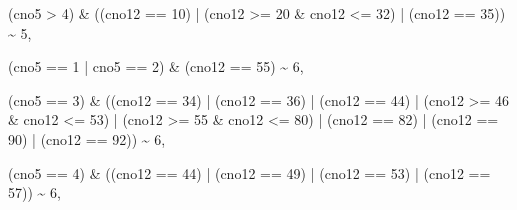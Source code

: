 \documentclass[
]{book}
\newenvironment{Shaded}{\begin{snugshade}}{\end{snugshade}}
\newcommand{\DecValTok}[1]{\textcolor[rgb]{0.00,0.00,0.81}{#1}}
\newcommand{\NormalTok}[1]{#1}
\newcommand{\SpecialCharTok}[1]{\textcolor[rgb]{0.00,0.00,0.00}{#1}}
\begin{document}
\begin{Shaded}
\begin{Highlighting}[]
\NormalTok{                        (cno5 }\SpecialCharTok{\textgreater{}} \DecValTok{4}\NormalTok{) }\SpecialCharTok{\&}\NormalTok{ ((cno12 }\SpecialCharTok{==} \DecValTok{10}\NormalTok{) }\SpecialCharTok{|}\NormalTok{ (cno12 }\SpecialCharTok{\textgreater{}=} \DecValTok{20} \SpecialCharTok{\&}\NormalTok{ cno12 }\SpecialCharTok{\textless{}=} \DecValTok{32}\NormalTok{) }\SpecialCharTok{|}\NormalTok{ (cno12 }\SpecialCharTok{==} \DecValTok{35}\NormalTok{)) }\SpecialCharTok{\textasciitilde{}} \DecValTok{5}\NormalTok{,}
                        
\NormalTok{                        (cno5 }\SpecialCharTok{==} \DecValTok{1} \SpecialCharTok{|}\NormalTok{ cno5 }\SpecialCharTok{==} \DecValTok{2}\NormalTok{) }\SpecialCharTok{\&}\NormalTok{ (cno12 }\SpecialCharTok{==} \DecValTok{55}\NormalTok{) }\SpecialCharTok{\textasciitilde{}} \DecValTok{6}\NormalTok{,}
                        
\NormalTok{                        (cno5 }\SpecialCharTok{==} \DecValTok{3}\NormalTok{) }\SpecialCharTok{\&}\NormalTok{ ((cno12 }\SpecialCharTok{==} \DecValTok{34}\NormalTok{) }\SpecialCharTok{|}\NormalTok{ (cno12 }\SpecialCharTok{==} \DecValTok{36}\NormalTok{) }\SpecialCharTok{|}\NormalTok{ (cno12 }\SpecialCharTok{==} \DecValTok{44}\NormalTok{) }\SpecialCharTok{|} 
\NormalTok{                        (cno12 }\SpecialCharTok{\textgreater{}=} \DecValTok{46} \SpecialCharTok{\&}\NormalTok{ cno12 }\SpecialCharTok{\textless{}=} \DecValTok{53}\NormalTok{) }\SpecialCharTok{|}\NormalTok{ (cno12 }\SpecialCharTok{\textgreater{}=} \DecValTok{55} \SpecialCharTok{\&}\NormalTok{ cno12 }\SpecialCharTok{\textless{}=} \DecValTok{80}\NormalTok{) }\SpecialCharTok{|} 
\NormalTok{                        (cno12 }\SpecialCharTok{==} \DecValTok{82}\NormalTok{) }\SpecialCharTok{|}\NormalTok{ (cno12 }\SpecialCharTok{==} \DecValTok{90}\NormalTok{) }\SpecialCharTok{|}\NormalTok{ (cno12 }\SpecialCharTok{==} \DecValTok{92}\NormalTok{)) }\SpecialCharTok{\textasciitilde{}} \DecValTok{6}\NormalTok{,}
                        
\NormalTok{                        (cno5 }\SpecialCharTok{==} \DecValTok{4}\NormalTok{) }\SpecialCharTok{\&}\NormalTok{ ((cno12 }\SpecialCharTok{==} \DecValTok{44}\NormalTok{) }\SpecialCharTok{|}\NormalTok{ (cno12 }\SpecialCharTok{==} \DecValTok{49}\NormalTok{) }\SpecialCharTok{|}\NormalTok{ (cno12 }\SpecialCharTok{==} \DecValTok{53}\NormalTok{) }\SpecialCharTok{|}\NormalTok{ (cno12 }\SpecialCharTok{==} \DecValTok{57}\NormalTok{)) }\SpecialCharTok{\textasciitilde{}} \DecValTok{6}\NormalTok{,}
                        

\end{Highlighting}
\end{Shaded}
\end{document}
